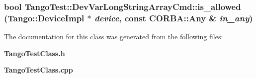 \subsubsection{\setlength{\rightskip}{0pt plus 5cm}bool Tango\-Test::Dev\-Var\-Long\-String\-Array\-Cmd::is\_\-allowed (Tango::Device\-Impl $\ast$ {\em device}, const CORBA::Any \& {\em in\_\-any})\hspace{0.3cm}{\tt  [virtual]}}\label{classTangoTest_1_1DevVarLongStringArrayCmd_a3}




The documentation for this class was generated from the following files:\begin{CompactItemize}
\item 
{\bf Tango\-Test\-Class.h}\item 
{\bf Tango\-Test\-Class.cpp}\end{CompactItemize}
